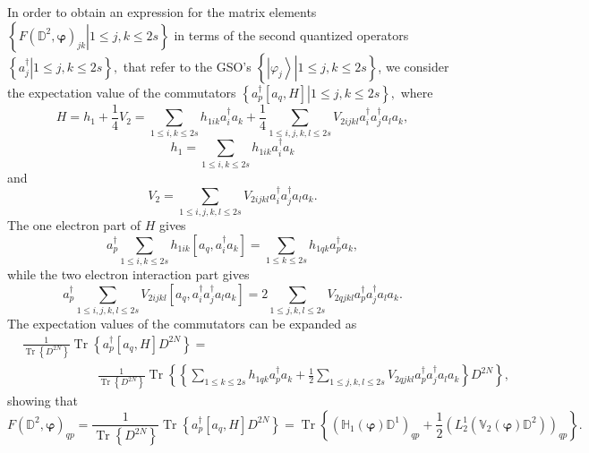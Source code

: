\documentclass[aps,preprint]{revtex4}%
\begin{document}
In order to obtain an expression for the matrix elements $\left\{  \left.
F\left(  \mathbb{D}^{2},\mathbf{\varphi}\right)  _{jk}\right\vert 1\leq
j,k\leq2s\right\}  $ in terms of the second quantized operators $\left\{
\left.  a_{j}^{\dagger}\right\vert 1\leq j,k\leq2s\right\}  ,$ that refer to
the GSO's $\left\{  \left.  \left\vert \varphi_{j}\right\rangle \right\vert
1\leq j,k\leq2s\right\}  $, we consider the expectation value of the
commutators $\left\{  \left.  a_{p}^{\dagger}\left[  a_{q},H\right]
\right\vert 1\leq j,k\leq2s\right\}  ,$ where
\begin{equation}
H=h_{1}+\frac{1}{4}V_{2}=\sum_{1\leq i,k\leq2s}h_{1ik}a_{i}^{\dagger}%
a_{k}+\frac{1}{4}\sum_{1\leq i,j,k,l\leq2s}V_{2ijkl}a_{i}^{\dagger}%
a_{j}^{\dagger}a_{l}a_{k},
\end{equation}%
\begin{equation}
h_{1}=\sum_{1\leq i,k\leq2s}h_{1ik}a_{i}^{\dagger}a_{k}%
\end{equation}
and
\begin{equation}
V_{2}=\sum_{1\leq i,j,k,l\leq2s}V_{2ijkl}a_{i}^{\dagger}a_{j}^{\dagger}%
a_{l}a_{k}.
\end{equation}
The one electron part of $H$ gives
\begin{equation}
a_{p}^{\dagger}\sum_{1\leq i,k\leq2s}h_{1ik}\left[  a_{q},a_{i}^{\dagger}%
a_{k}\right]  =\sum_{1\leq k\leq2s}h_{1qk}a_{p}^{\dagger}a_{k},
\end{equation}
while the two electron interaction part gives
\begin{equation}
a_{p}^{\dagger}\sum_{1\leq i,j,k,l\leq2s}V_{2ijkl}\left[  a_{q},a_{i}%
^{\dagger}a_{j}^{\dagger}a_{l}a_{k}\right]  =2\sum_{1\leq j,k,l\leq
2s}V_{2qjkl}a_{p}^{\dagger}a_{j}^{\dagger}a_{l}a_{k}.
\end{equation}
The expectation values of the commutators can be expanded as
\begin{align}
&  \frac{1}{\operatorname{Tr}\left\{  D^{2N}\right\}  }\operatorname{Tr}%
\left\{  a_{p}^{\dagger}\left[  a_{q},H\right]  D^{2N}\right\}  =\nonumber\\
&  \qquad\qquad\qquad\frac{1}{\operatorname{Tr}\left\{  D^{2N}\right\}
}\operatorname{Tr}\left\{  \left\{  \sum_{1\leq k\leq2s}h_{1qk}a_{p}^{\dagger
}a_{k}+\frac{1}{2}\sum_{1\leq j,k,l\leq2s}V_{2qjkl}a_{p}^{\dagger}%
a_{j}^{\dagger}a_{l}a_{k}\right\}  D^{2N}\right\}  ,
\end{align}
showing that
\begin{equation}
F\left(  \mathbb{D}^{2},\mathbf{\varphi}\right)  _{qp}=\frac{1}%
{\operatorname{Tr}\left\{  D^{2N}\right\}  }\operatorname{Tr}\left\{
a_{p}^{\dagger}\left[  a_{q},H\right]  D^{2N}\right\}  =\operatorname{Tr}%
\left\{  \left(  \mathbb{H}_{1}\left(  \mathbf{\varphi}\right)  \mathbb{D}%
^{1}\right)  _{qp}+\frac{1}{2}\left(  L_{2}^{1}\left(  \mathbb{V}_{2}\left(
\mathbf{\varphi}\right)  \mathbb{D}^{2}\right)  \right)  _{qp}\right\}  .
\label{Fockelem}%
\end{equation}
\end{document}
